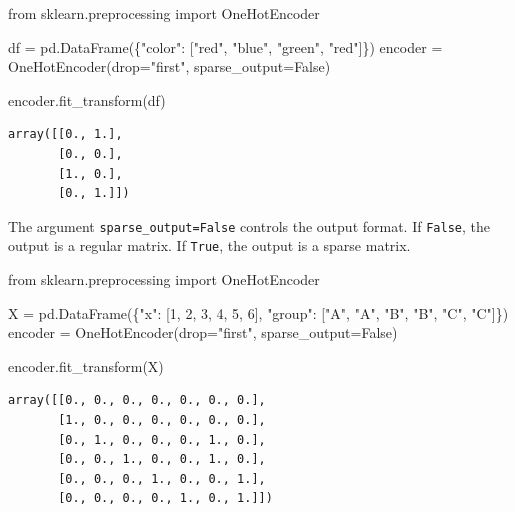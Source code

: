 \documentclass[
  letterpaper,
  DIV=11,
  numbers=noendperiod]{scrreprt}
\newenvironment{Shaded}{\begin{snugshade}}{\end{snugshade}}
\newcommand{\DecValTok}[1]{\textcolor[rgb]{0.68,0.00,0.00}{#1}}
\newcommand{\ImportTok}[1]{\textcolor[rgb]{0.00,0.46,0.62}{#1}}
\newcommand{\NormalTok}[1]{\textcolor[rgb]{0.00,0.23,0.31}{#1}}
\newcommand{\OperatorTok}[1]{\textcolor[rgb]{0.37,0.37,0.37}{#1}}
\newcommand{\StringTok}[1]{\textcolor[rgb]{0.13,0.47,0.30}{#1}}
\newcommand{\VariableTok}[1]{\textcolor[rgb]{0.07,0.07,0.07}{#1}}
\theoremstyle{definition}
\theoremstyle{definition}
\theoremstyle{plain}
\theoremstyle{plain}
\theoremstyle{remark}
\begin{document}
\begin{Shaded}
\begin{Highlighting}[]
\ImportTok{from}\NormalTok{ sklearn.preprocessing }\ImportTok{import}\NormalTok{ OneHotEncoder}

\NormalTok{df }\OperatorTok{=}\NormalTok{ pd.DataFrame(\{}\StringTok{"color"}\NormalTok{: [}\StringTok{"red"}\NormalTok{, }\StringTok{"blue"}\NormalTok{, }\StringTok{"green"}\NormalTok{, }\StringTok{"red"}\NormalTok{]\})}
\NormalTok{encoder }\OperatorTok{=}\NormalTok{ OneHotEncoder(drop}\OperatorTok{=}\StringTok{"first"}\NormalTok{, sparse\_output}\OperatorTok{=}\VariableTok{False}\NormalTok{) }

\NormalTok{encoder.fit\_transform(df)}
\end{Highlighting}
\end{Shaded}

\begin{verbatim}
array([[0., 1.],
       [0., 0.],
       [1., 0.],
       [0., 1.]])
\end{verbatim}

The argument \texttt{sparse\_output=False} controls the output format.
If \texttt{False}, the output is a regular matrix. If \texttt{True}, the
output is a sparse matrix.

\begin{Shaded}
\begin{Highlighting}[]
\ImportTok{from}\NormalTok{ sklearn.preprocessing }\ImportTok{import}\NormalTok{ OneHotEncoder}

\NormalTok{X }\OperatorTok{=}\NormalTok{ pd.DataFrame(\{}\StringTok{"x"}\NormalTok{: [}\DecValTok{1}\NormalTok{, }\DecValTok{2}\NormalTok{, }\DecValTok{3}\NormalTok{, }\DecValTok{4}\NormalTok{, }\DecValTok{5}\NormalTok{, }\DecValTok{6}\NormalTok{], }\StringTok{"group"}\NormalTok{: [}\StringTok{"A"}\NormalTok{, }\StringTok{"A"}\NormalTok{, }\StringTok{"B"}\NormalTok{, }\StringTok{"B"}\NormalTok{, }\StringTok{"C"}\NormalTok{, }\StringTok{"C"}\NormalTok{]\})}
\NormalTok{encoder }\OperatorTok{=}\NormalTok{ OneHotEncoder(drop}\OperatorTok{=}\StringTok{"first"}\NormalTok{, sparse\_output}\OperatorTok{=}\VariableTok{False}\NormalTok{)}

\NormalTok{encoder.fit\_transform(X)}
\end{Highlighting}
\end{Shaded}

\begin{verbatim}
array([[0., 0., 0., 0., 0., 0., 0.],
       [1., 0., 0., 0., 0., 0., 0.],
       [0., 1., 0., 0., 0., 1., 0.],
       [0., 0., 1., 0., 0., 1., 0.],
       [0., 0., 0., 1., 0., 0., 1.],
       [0., 0., 0., 0., 1., 0., 1.]])
\end{verbatim}
\end{document}
